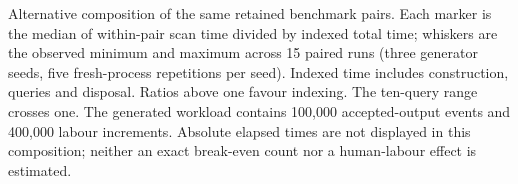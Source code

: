 Alternative composition of the same retained benchmark pairs. Each marker is
the median of within-pair scan time divided by indexed total time; whiskers are
the observed minimum and maximum across 15 paired runs (three generator seeds,
five fresh-process repetitions per seed). Indexed time includes construction,
queries and disposal. Ratios above one favour indexing. The ten-query range
crosses one. The generated workload contains 100,000 accepted-output events and
400,000 labour increments. Absolute elapsed times are not displayed in this
composition; neither an exact break-even count nor a human-labour effect is
estimated.
